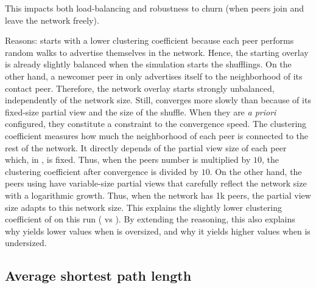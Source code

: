 \begin{asparadesc}
\begin{inparaenum}
  \end{inparaenum}
  This impacts both load-balancing and robustness to churn (when peers
  join and leave the network freely).
\item[Reasons:] \CYCLON starts with a lower clustering coefficient
  because each peer performs random walks to advertise themselves in
  the network. Hence, the starting overlay is already slightly
  balanced when the simulation starts the shufflings. On the other
  hand, a newcomer peer in \SPRAY only advertises itself to the
  neighborhood of its contact peer. Therefore, the network overlay
  starts strongly unbalanced, independently of the network
  size. Still, \CYCLON converges more slowly than \SPRAY because of
  its fixed-size partial view and the size of the shuffle. When they
  are \emph{a priori} configured, they constitute a constraint to the
  convergence speed.  The clustering coefficient measures how much the
  neighborhood of each peer is connected to the rest of the
  network. It directly depends of the partial view size of each peer
  which, in \CYCLON, is fixed. Thus, when the peers number is
  multiplied by $10$, the clustering coefficient after convergence is
  divided by $10$. On the other hand, the peers using \SPRAY have
  variable-size partial views that carefully reflect the network size
  with a logarithmic growth. Thus, when the network has 1k peers, the
  partial view size adapts to this network size. This explains the
  slightly lower clustering coefficient of \SPRAY on this run ( vs ). By extending the reasoning, this also explains
  why \SPRAY yields lower values when \CYCLON is oversized, and why it
  yields higher values when \CYCLON is undersized.
\end{asparadesc}

\subsection{Average shortest path length}
\label{subsec:avg}

